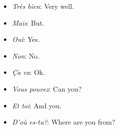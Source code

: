 \begin{itemize}
\item{\emph{Tr\`es bien}: Very well.} 

\item{\emph{Mais}: But.}

\item{\emph{Oui}: Yes.} 

\item{\emph{Non}: No.}

\item{\emph{\c{C}a va}: Ok.} 

\item{\emph{Vous pouvez}: Can you?}

\item{\emph{Et toi}: And you.}

\item{\emph{D'o\`u es-tu?}: Where are you from?}

\end{itemize}
